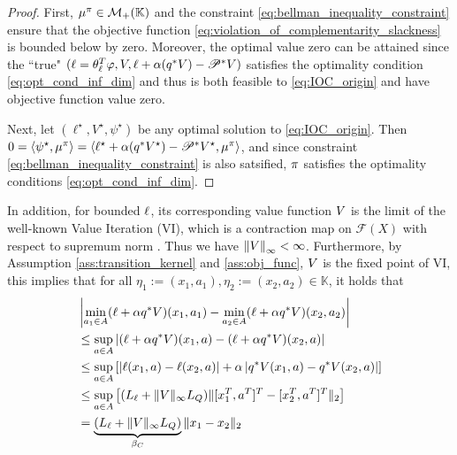 \begin{proof}
First, $\mu^{\relax{\pi}}\in\mathcal{M}_+(\mathbb{K})$ and the constraint \eqref{eq:bellman_inequality_constraint} ensure that the objective function \eqref{eq:violation_of_complementarity_slackness} is bounded below by zero. 
Moreover, the optimal value zero can be attained since the ``true" $(\relax{\ell}=\relax{\theta}_\ell^T\varphi, \relax{V}, \relax{\ell} +\alpha (q^*\relax{V}) - \mathscr{P}^*\relax{V})$ satisfies the optimality condition \eqref{eq:opt_cond_inf_dim} and thus is both feasible to \eqref{eq:IOC_origin} and have objective function value zero. 

Next, let $(\ell^\star, V^\star, \psi^\star)$ be any optimal solution to \eqref{eq:IOC_origin}. Then $0 = \langle\psi^\star,\mu^{\relax{\pi}} \rangle = \langle \ell^\star +\alpha (q^*V^\star) - \mathscr{P}^*V^\star, \mu^{\relax{\pi}}\rangle$, and since constraint \eqref{eq:bellman_inequality_constraint} is also satsified, $\relax{\pi}$ satisfies the optimality conditions \eqref{eq:opt_cond_inf_dim}.
\end{proof}

In addition, for bounded $\relax{\ell}$, its corresponding value function $\relax{V}$ is the limit of the well-known Value Iteration (VI), which is a contraction map on $ \mathscr{F}(X) $ with respect to supremum norm \citep[p. 52]{hernandez2012discrete}. 
Thus we have $\left\|\relax{V}\right\|_\infty< \infty$. 
Furthermore, by Assumption \ref{ass:transition_kernel} and \ref{ass:obj_func}, $\relax{V}$ is the fixed point of VI, this implies that for all $\eta_1:=(x_1,a_1),\eta_2:=(x_2,a_2)\in\mathbb{K}$, it holds that
\begin{align*}
&\left|\min_{a_1\in A}(\relax{\ell}+\alpha q^* \relax{V})(x_1,a_1)-\min_{a_2\in A}(\relax{\ell}+\alpha q^* \relax{V})(x_2,a_2)\right|\\
&\le \sup_{a\in A}\left|(\relax{\ell}+\alpha q^* \relax{V})(x_1,a)-(\relax{\ell}+\alpha q^* \relax{V})(x_2,a)\right|\\
&\le\sup_{a\in A}\left[\left|\relax{\ell}(x_1,a)-\relax{\ell}(x_2,a)\right|+\alpha\left|q^*\relax{V}(x_1,a)-q^*\relax{V}(x_2,a)\right|\right]\\
&\le \sup_{a\in A}\left[(L_\ell+\|\relax{V}\|_\infty L_Q)\|[x_1^T,a^T]^T-[x_2^T,a^T]^T\|_2\right]\\
&=\underbrace{(L_\ell+\|\relax{V}\|_\infty L_Q)}_{\beta_C}\|x_1-x_2\|_2
\end{align*}

